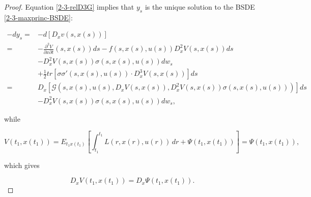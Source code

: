 \begin{theorem}
\begin{proof}
        Equation \eqref{2-3-relD3G} implies that $y_s$ is the unique solution to the BSDE \eqref{2-3-maxprinc-BSDE}:

        \begin{align*}
            -dy_s = & -d[D_xv(s,x(s))] \\
            = & - \frac{\partial^2V}{\partial x\partial t}(s,x(s))ds - f(s,x(s),u(s))D_x^2V(s,x(s))ds \\
            & - D_x^2V(s,x(s))\sigma(s,x(s),u(s))dw_s \\
            & + \frac{1}{2}tr\left[\sigma\sigma'(s,x(s),u(s))\cdot D_x^3V(s,x(s))\right]ds \\
            = & D_x\left[\mathcal{G}(s,x(s),u(s),D_xV(s,x(s)),D_x^2V(s,x(s))\sigma(s,x(s),u(s)))\right]ds \\
            & - D_x^2V(s,x(s))\sigma(s,x(s),u(s))dw_s,
        \end{align*}

        while

        \[V(t_1,x(t_1)) = E_{t_1x(t_1)}\left[\int_{t_1}^{t_1} L(r,x(r),u(r))\,dr + \Psi(t_1,x(t_1))\right] = \Psi(t_1,x(t_1)), \]

        which gives

        \[D_x V(t_1,x(t_1)) = D_x\Psi(t_1,x(t_1)).\]
    \end{proof}
\end{theorem}